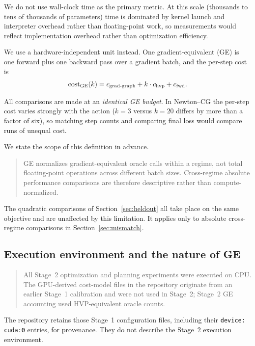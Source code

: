We do not use wall-clock time as the primary metric. At this scale (thousands to
tens of thousands of parameters) time is dominated by kernel launch and
interpreter overhead rather than floating-point work, so measurements would
reflect implementation overhead rather than optimization efficiency.

We use a hardware-independent unit instead. One gradient-equivalent (GE) is one
forward plus one backward pass over a gradient batch, and the per-step cost is
\begin{equation}
  \mathrm{cost}_{\text{GE}}(k) = c_{\text{grad-graph}} + k \cdot c_{\text{hvp}}
    + c_{\text{fwd}} .
\end{equation}

All comparisons are made at an \emph{identical GE budget}. In Newton--CG the
per-step cost varies strongly with the action ($k = 3$ versus $k = 20$ differs by
more than a factor of six), so matching step counts and comparing final loss
would compare runs of unequal cost.

We state the scope of this definition in advance.

\begin{quote}
GE normalizes gradient-equivalent oracle calls within a regime, not total
floating-point operations across different batch sizes. Cross-regime absolute
performance comparisons are therefore descriptive rather than compute-normalized.
\end{quote}

The quadratic comparisons of Section~\ref{sec:heldout} all take place on the same
objective and are unaffected by this limitation. It applies only to absolute
cross-regime comparisons in Section~\ref{sec:mismatch}.

\subsection{Execution environment and the nature of GE}
\label{sec:cpu}

\begin{quote}
All Stage~2 optimization and planning experiments were executed on CPU. The
GPU-derived cost-model files in the repository originate from an earlier Stage~1
calibration and were not used in Stage~2; Stage~2 GE accounting used
HVP-equivalent oracle counts.
\end{quote}

The repository retains those Stage~1 configuration files, including their
\texttt{device: cuda:0} entries, for provenance. They do not describe the Stage~2
execution environment.

